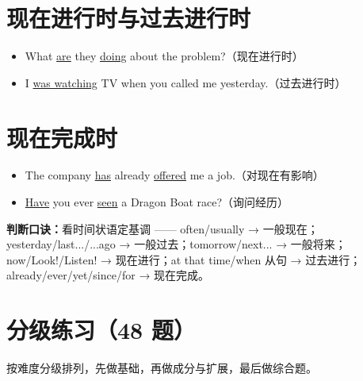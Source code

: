 \documentclass[11pt,a4paper]{ctexart}
\begin{document}
\section{现在进行时与过去进行时}
\begin{itemize}[leftmargin=1.4em]
\item What \underline{are} they \underline{doing} about the problem?（现在进行时）
\item I \underline{was watching} TV when you called me yesterday.（过去进行时）
\end{itemize}

\section{现在完成时}
\begin{itemize}[leftmargin=1.4em]
\item The company \underline{has} already \underline{offered} me a job.（对现在有影响）
\item \underline{Have} you ever \underline{seen} a Dragon Boat race?（询问经历）
\end{itemize}
\textbf{判断口诀：}看时间状语定基调 —— often/usually → 一般现在；yesterday/last.../...ago → 一般过去；tomorrow/next... → 一般将来；now/Look!/Listen! → 现在进行；at that time/when 从句 → 过去进行；already/ever/yet/since/for → 现在完成。


\newpage
\section{分级练习（48 题）}
\noindent 按难度分级排列，先做基础，再做成分与扩展，最后做综合题。
\end{document}
